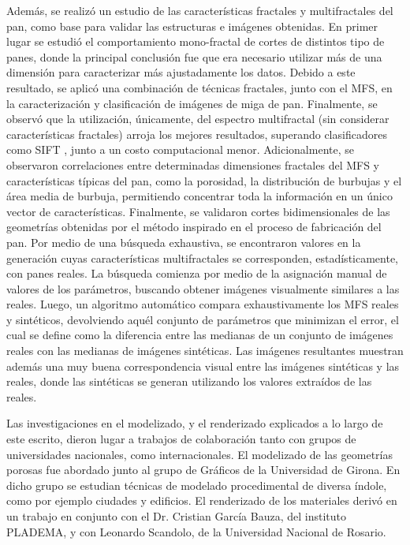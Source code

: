 Además, se realizó un estudio de las características fractales y multifractales del pan, como base para validar las estructuras e imágenes obtenidas.
En primer lugar se estudió el comportamiento mono-fractal de cortes de distintos tipo de panes, donde la principal conclusión fue que era necesario utilizar más de una dimensión para caracterizar más ajustadamente los datos.
Debido a este resultado, se aplicó una combinación de técnicas fractales, junto con el MFS, en la caracterización y clasificación de imágenes de miga de pan. Finalmente, se observó que la utilización, únicamente, del espectro multifractal (sin considerar características fractales) arroja los mejores resultados, superando clasificadores como SIFT \cite{Lowe2004}, junto a un costo computacional menor.
Adicionalmente, se observaron correlaciones entre determinadas dimensiones fractales del MFS y características típicas del pan, como la porosidad, la distribución de burbujas y el área media de burbuja, permitiendo concentrar toda la información en un único vector de características.
Finalmente, se validaron cortes bidimensionales de las geometrías obtenidas por el método inspirado en el proceso de fabricación del pan.
Por medio de una búsqueda exhaustiva, se encontraron valores en la generación cuyas características multifractales se corresponden, estadísticamente, con panes reales.
La búsqueda comienza por medio de la asignación manual de valores de los parámetros, buscando obtener imágenes visualmente similares a las reales.
Luego, un algoritmo automático compara exhaustivamente los MFS reales y sintéticos, devolviendo aquél conjunto de parámetros que minimizan el error, el cual se define como la diferencia entre las medianas de un conjunto de imágenes reales con las medianas de imágenes sintéticas.
Las imágenes resultantes muestran además una muy buena correspondencia visual entre las imágenes sintéticas y las reales, donde las sintéticas se generan utilizando los valores extraídos de las reales.

Las investigaciones en el modelizado, y el renderizado explicados a lo largo de este escrito, dieron lugar a trabajos de colaboración tanto con grupos de universidades nacionales, como internacionales.
El modelizado de las geometrías porosas fue abordado junto al grupo de Gráficos de la Universidad de Girona.
En dicho grupo se estudian técnicas de modelado procedimental de diversa índole, como por ejemplo ciudades y edificios.
El renderizado de los materiales derivó en un trabajo en conjunto con el Dr. Cristian García Bauza, del instituto PLADEMA, y con Leonardo Scandolo, de la Universidad Nacional de Rosario.



